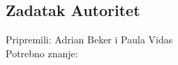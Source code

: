 \subsection*{Zadatak Autoritet}
\textsf{Pripremili: Adrian Beker i Paula Vidas}\\
\textsf{Potrebno znanje: }
